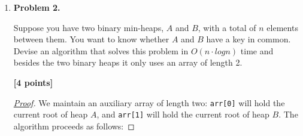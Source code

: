 \documentclass[11pt]{article}
\begin{document}
\begin{enumerate}
\begin{proof}[\underline{Proof}]
Total Cost:

\[
\begin{aligned}
T(n)
&= \bigl(\log 1 + \log 2 + \log 3 + \cdots + \log n \bigr) 
   + \bigl(2^0 + 2^1 + 2^2 + \cdots + 2^{\log n}\bigr) \\[6pt]
&= \sum_{k=1}^{n} \log k \;+\; \sum_{k=0}^{\log n} 2^k \\[6pt]
&= \log(n!) \;+\; \frac{2^{\log n + 1} - 1}{2 - 1} 
   \qquad \text{(geometric series sum)} \\[6pt]
&= \log(n!) \;+\; 2^{\log n + 1} - 1 \\[6pt]
&= \log(n!) \;+\; 2 \cdot 2^{\log n} - 1 \\[6pt]
&= \log(n!) \;+\; 2n - 1. 
\end{aligned}
\]

Using the bound \(\log(n!) < n \log n\), we obtain
\[
T(n) < n \log n + 2n - 1 \;\in\; O(n \log n).
\]

\underline{Conclusion.} The cost of \texttt{build} in the online case is \(O(n \cdot log n)\) even with the cost of copying taken into account.

\end{proof}


\item \textbf{Problem 2.}

Suppose you have two binary min-heaps, \(A\) and \(B\), with a total of \(n\) elements between them. You want to know whether \(A\) and \(B\) have a key in common. Devise an algorithm that solves this problem in \(O(n \cdot log n)\) time and besides the two binary heaps it only uses an array of length 2.

\begin{flushright}
\end{flushright}

\begin{flushright}
\textbf{[4 points]}
\end{flushright}

\begin{proof}[\underline{Proof}]

We maintain an auxiliary array of length two: \texttt{arr[0]} will hold the current root of heap \(A\), and \texttt{arr[1]} will hold the current root of heap \(B\).  
The algorithm proceeds as follows:


\end{proof}
\end{enumerate}
\end{document}

